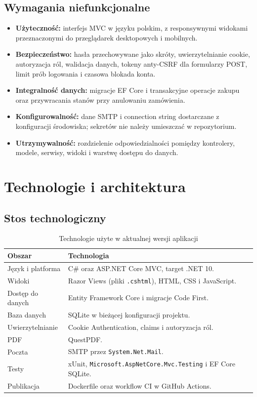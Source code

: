 \documentclass[12pt,a4paper]{article}
\begin{document}
\subsection{Wymagania niefunkcjonalne}
\begin{itemize}[leftmargin=*]
    \item \textbf{Użyteczność:} interfejs MVC w języku polskim, z responsywnymi
    widokami przeznaczonymi do przeglądarek desktopowych i mobilnych.
    \item \textbf{Bezpieczeństwo:} hasła przechowywane jako skróty, uwierzytelnianie
    cookie, autoryzacja ról, walidacja danych, tokeny anty-CSRF dla formularzy
    POST, limit prób logowania i czasowa blokada konta.
    \item \textbf{Integralność danych:} migracje EF Core i transakcyjne operacje
    zakupu oraz przywracania stanów przy anulowaniu zamówienia.
    \item \textbf{Konfigurowalność:} dane SMTP i connection string dostarczane
    z konfiguracji środowiska; sekretów nie należy umieszczać w repozytorium.
    \item \textbf{Utrzymywalność:} rozdzielenie odpowiedzialności pomiędzy
    kontrolery, modele, serwisy, widoki i warstwę dostępu do danych.
\end{itemize}

\section{Technologie i architektura}

\subsection{Stos technologiczny}
\begin{table}[H]
\centering
\begin{tabularx}{\textwidth}{@{}l X@{}}
\toprule
\textbf{Obszar} & \textbf{Technologia}\\
\midrule
Język i platforma & C\# oraz ASP.NET Core MVC, target .NET 10.\\
Widoki & Razor Views (pliki \texttt{.cshtml}), HTML, CSS i JavaScript.\\
Dostęp do danych & Entity Framework Core i migracje Code First.\\
Baza danych & SQLite w bieżącej konfiguracji projektu.\\
Uwierzytelnianie & Cookie Authentication, claims i autoryzacja ról.\\
PDF & QuestPDF.\\
Poczta & SMTP przez \texttt{System.Net.Mail}.\\
Testy & xUnit, \texttt{Microsoft.AspNetCore.Mvc.Testing} i EF Core SQLite.\\
Publikacja & Dockerfile oraz workflow CI w GitHub Actions.\\
\bottomrule
\end{tabularx}
\caption{Technologie użyte w aktualnej wersji aplikacji}
\end{table}
\end{document}
